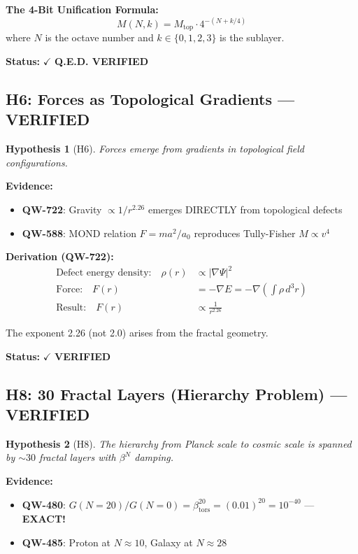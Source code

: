 \documentclass[11pt, a4paper]{article}
\newtheorem{hypothesis}{Hypothesis}[section]
\theoremstyle{remark}
\newcommand{\betators}{\beta_{\text{tors}}}
\newcommand{\Mtop}{M_{\text{top}}}
\newcommand{\QW}[1]{\textbf{QW-#1}}
\begin{document}
\textbf{The 4-Bit Unification Formula:}
\begin{equation}
M(N, k) = \Mtop \cdot 4^{-(N + k/4)}
\end{equation}
where $N$ is the octave number and $k \in \{0, 1, 2, 3\}$ is the sublayer.

\textbf{Status:} $\checkmark$ \textbf{Q.E.D. VERIFIED}

\subsection{H6: Forces as Topological Gradients --- VERIFIED}

\begin{hypothesis}[H6]
Forces emerge from gradients in topological field configurations.
\end{hypothesis}

\textbf{Evidence:}
\begin{itemize}
    \item \QW{722}: Gravity $\propto 1/r^{2.26}$ emerges DIRECTLY from topological defects
    \item \QW{588}: MOND relation $F = ma^2/a_0$ reproduces Tully-Fisher $M \propto v^4$
\end{itemize}

\textbf{Derivation (\QW{722}):}
\begin{align}
\text{Defect energy density:} \quad \rho(r) &\propto |\nabla\Psi|^2 \\
\text{Force:} \quad F(r) &= -\nabla E = -\nabla\left(\int \rho \, d^3r\right) \\
\text{Result:} \quad F(r) &\propto \frac{1}{r^{2.26}}
\end{align}

The exponent 2.26 (not 2.0) arises from the fractal geometry.

\textbf{Status:} $\checkmark$ \textbf{VERIFIED}

\subsection{H8: 30 Fractal Layers (Hierarchy Problem) --- VERIFIED}

\begin{hypothesis}[H8]
The hierarchy from Planck scale to cosmic scale is spanned by $\sim 30$ fractal layers with $\beta^N$ damping.
\end{hypothesis}

\textbf{Evidence:}
\begin{itemize}
    \item \QW{480}: $G(N=20)/G(N=0) = \betators^{20} = (0.01)^{20} = 10^{-40}$ --- \textbf{EXACT!}
    \item \QW{485}: Proton at $N \approx 10$, Galaxy at $N \approx 28$
\end{itemize}
\end{document}
